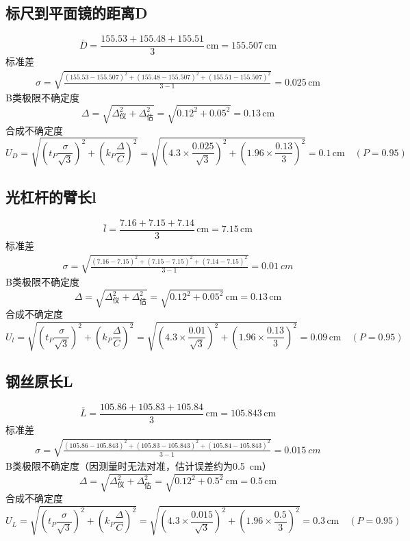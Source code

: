 \documentclass{article}
\begin{document}
\subsection*{标尺到平面镜的距离D}
$$
    \bar{D}=\frac{155.53+155.48 +155.51 }{3}\,\mathrm{cm}=155.507\,\mathrm{cm}
$$
标准差
$$
    \begin{aligned}
        \sigma=\sqrt{\frac{(155.53-155.507)^2+(155.48-155.507)^2+(155.51-155.507)^2}{3-1}}=0.025\,\mathrm{cm}
    \end{aligned}
$$
B类极限不确定度
$$
    \Delta=\sqrt{\Delta_\text{仪}^2+\Delta_\text{估}^2}=\sqrt{0.12^2+0.05^2}=0.13\,\mathrm{cm}
$$
合成不确定度
$$
U_{D}=\sqrt{\left(t_P\frac{\sigma}{\sqrt{3}}\right)^2+\left(k_P\frac{\Delta}{C}\right)^2}=\sqrt{\left(4.3\times \frac{0.025}{\sqrt{3}}\right)^2+\left(1.96\times\frac{0.13}{3}\right)^2}=0.1\,\mathrm{cm}  \quad(P=0.95)    
$$

\subsection*{光杠杆的臂长l}
$$
    \bar{l}=\frac{7.16+7.15+7.14}{3}\,\mathrm{cm}=7.15\,\mathrm{cm}
$$
标准差
$$
    \begin{aligned}
        \sigma=\sqrt{\frac{(7.16-7.15)^2+(7.15-7.15)^2+(7.14-7.15)^2}{3-1}}=\SI{0.01}{cm}
    \end{aligned}
$$
B类极限不确定度
$$
    \Delta=\sqrt{\Delta_\text{仪}^2+\Delta_\text{估}^2}=\sqrt{0.12^2+0.05^2}\,\mathrm{cm}=0.13\,\mathrm{cm}
$$
合成不确定度
$$
U_l=\sqrt{\left(t_P\frac{\sigma}{\sqrt{3}}\right)^2+\left(k_P\frac{\Delta}{C}\right)^2}=\sqrt{\left(4.3\times \frac{0.01}{\sqrt{3}}\right)^2+\left(1.96\times\frac{0.13}{3}\right)^2}=0.09\,\mathrm{cm}  \quad(P=0.95) 
$$

\subsection*{钢丝原长L}
$$
    \bar{L}=\frac{105.86+105.83+105.84}{3}\,\mathrm{cm}=105.843\,\mathrm{cm}
$$
标准差
$$
    \begin{aligned}
        \sigma=\sqrt{\frac{(105.86-105.843)^2+(105.83-105.843)^2+(105.84-105.843)^2}{3-1}}=\SI{0.015}{cm}
    \end{aligned}
$$
B类极限不确定度（因测量时无法对准，估计误差约为\SI{0.5}{cm}）
$$
    \Delta=\sqrt{\Delta_\text{仪}^2+\Delta_\text{估}^2}=\sqrt{0.12^2+0.5^2}\,\mathrm{cm}=0.5\,\mathrm{cm}
$$
合成不确定度
$$
U_L=\sqrt{\left(t_P\frac{\sigma}{\sqrt{3}}\right)^2+\left(k_P\frac{\Delta}{C}\right)^2}=\sqrt{\left(4.3\times \frac{0.015}{\sqrt{3}}\right)^2+\left(1.96\times\frac{0.5}{3}\right)^2}=0.3\,\mathrm{cm}  \quad(P=0.95) 
$$
\end{document}
